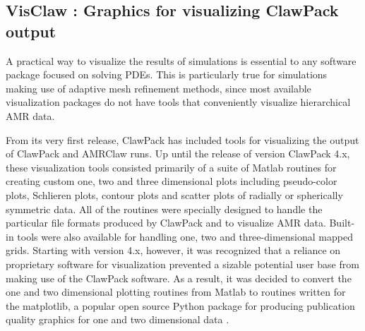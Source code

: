 %
%
%

\newcommand{\cpack}{{\sc ClawPack}\xspace}

\newcommand{\vclaw}{{\sc VisClaw}\xspace}
\newcommand{\aclaw}{{\sc AMRClaw\xspace}\xspace}
\newcommand{\gclaw}{{\sc GeoClaw\xspace}\xspace}
\newcommand{\cclaw}{{\sc Classic Claw}\xspace}
\newcommand{\pclaw}{{\sc PyClaw}\xspace}
\newcommand{\agis}{{\sc ArcGIS}\xspace}
\newcommand{\qgis}{{\sc QGIS}\xspace}

\newcommand{\mlab}{{\sc Matlab}\xspace}
\newcommand{\mplotlib}{{\sc matplotlib}\xspace}
\newcommand{\visit}{{\sc VisIt}\xspace}

\subsection{VisClaw : Graphics for visualizing \cpack output}
A practical way to visualize the results of simulations is
essential to any software package focused on solving PDEs.
This is particularly true for simulations making use of adaptive mesh
refinement methods, since most available visualization packages do not
have tools that conveniently visualize hierarchical AMR data.

From its very first release,
\cpack has included tools for visualizing the output of \cpack and
\aclaw runs.  Up until the release of version \cpack 4.x, these
visualization tools consisted primarily of a suite of \mlab routines
for creating custom one, two and three dimensional plots including
pseudo-color plots, Schlieren plots, contour plots and scatter plots
of radially or spherically symmetric data. All of the routines were
specially designed to handle the particular file formats produced by
\cpack and to visualize AMR data.  Built-in tools were also available
for handling one, two and three-dimensional mapped grids.
Starting with version 4.x, however, it was recognized that a reliance
on proprietary software for visualization prevented a sizable
potential user base from making use of the \cpack software.  As a
result, it was decided to convert the one and two dimensional plotting
routines from \mlab to routines written for the \mplotlib,
a popular open source
Python package for producing publication quality graphics
for one and two dimensional data \cite{Hunter:2007}.

